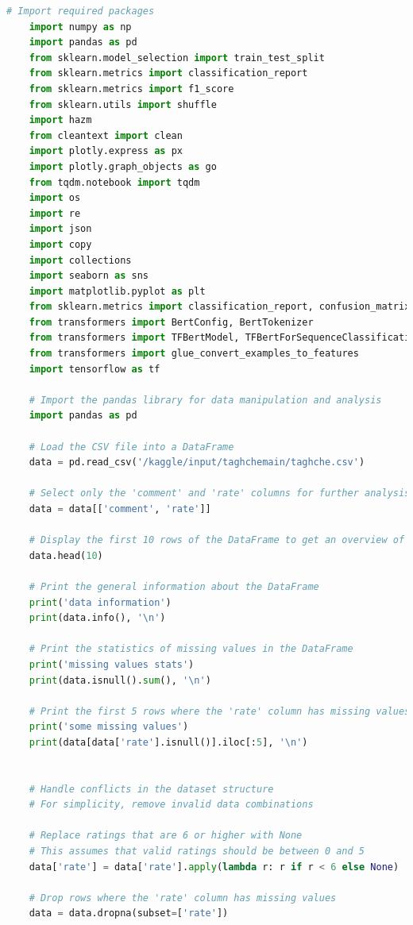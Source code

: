 \documentclass{solutionclass} %
\begin{document}
\begin{lstlisting}[language=Python]
    # Import required packages
    import numpy as np
    import pandas as pd
    from sklearn.model_selection import train_test_split
    from sklearn.metrics import classification_report
    from sklearn.metrics import f1_score
    from sklearn.utils import shuffle
    import hazm
    from cleantext import clean
    import plotly.express as px
    import plotly.graph_objects as go
    from tqdm.notebook import tqdm
    import os
    import re
    import json
    import copy
    import collections
    import seaborn as sns
    import matplotlib.pyplot as plt
    from sklearn.metrics import classification_report, confusion_matrix, accuracy_score, precision_score, recall_score, f1_score
    from transformers import BertConfig, BertTokenizer
    from transformers import TFBertModel, TFBertForSequenceClassification
    from transformers import glue_convert_examples_to_features
    import tensorflow as tf
    
    # Import the pandas library for data manipulation and analysis
    import pandas as pd
    
    # Load the CSV file into a DataFrame
    data = pd.read_csv('/kaggle/input/taghchemain/taghche.csv')
    
    # Select only the 'comment' and 'rate' columns for further analysis
    data = data[['comment', 'rate']]
    
    # Display the first 10 rows of the DataFrame to get an overview of the data
    data.head(10)
    
    # Print the general information about the DataFrame
    print('data information')
    print(data.info(), '\n')
    
    # Print the statistics of missing values in the DataFrame
    print('missing values stats')
    print(data.isnull().sum(), '\n')
    
    # Print the first 5 rows where the 'rate' column has missing values
    print('some missing values')
    print(data[data['rate'].isnull()].iloc[:5], '\n')
    
    
    # Handle conflicts in the dataset structure
    # For simplicity, remove invalid data combinations
    
    # Replace ratings that are 6 or higher with None
    # This assumes that valid ratings should be between 0 and 5
    data['rate'] = data['rate'].apply(lambda r: r if r < 6 else None)
    
    # Drop rows where the 'rate' column has missing values
    data = data.dropna(subset=['rate'])
    

\end{lstlisting}
\end{document}
